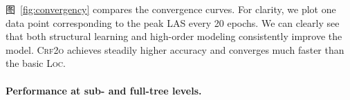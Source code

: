 图~\ref{fig:convergency} compares the convergence curves. %
For clarity, we plot one data point corresponding to the peak LAS every 20 epochs.
We can clearly see that both structural learning and high-order modeling
consistently improve the model.
\textsc{Crf2o} achieves steadily higher accuracy and converges much faster than the basic \textsc{Loc}.


\paragraph{Performance at sub- and full-tree levels.}

